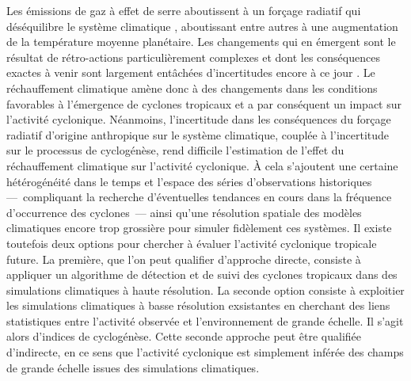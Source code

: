 \documentclass[../main.tex]{subfiles}
\begin{document}
Les émissions de gaz à effet de serre aboutissent à un forçage radiatif qui déséquilibre le système climatique \parencite{charney_carbon_1979}, aboutissant
entre autres à une augmentation de la température moyenne planétaire. Les changements qui en émergent sont le résultat de rétro-actions particulièrement
complexes et dont les conséquences exactes à venir sont largement entâchées d'incertitudes encore à ce jour \parencite{seneviratne_weather_2021}. Le
réchauffement climatique amène donc à des changements dans les conditions favorables à l'émergence de cyclones tropicaux et a par conséquent un impact sur
l'activité cyclonique. Néanmoins, l'incertitude dans les conséquences du forçage radiatif d'origine anthropique sur le système climatique, couplée à
l'incertitude sur le processus de cyclogénèse, rend difficile l'estimation de l'effet du réchauffement climatique sur l'activité cyclonique. À cela s'ajoutent
une certaine hétérogénéité dans le temps et l'espace des séries d'observations historiques ---~compliquant la recherche d'éventuelles tendances en cours dans la
fréquence d'occurrence des cyclones~--- ainsi qu'une résolution spatiale des modèles climatiques encore trop grossière pour simuler fidèlement ces systèmes. Il
existe toutefois deux options pour chercher à évaluer l'activité cyclonique tropicale future. La première, que l'on peut qualifier d'approche directe, consiste
à appliquer un algorithme de détection et de suivi des cyclones tropicaux dans des simulations climatiques à haute résolution. La seconde option consiste à
exploitier les simulations climatiques à basse résolution exsistantes en cherchant des liens statistiques entre l'activité observée et l'environnement de grande
échelle. Il s'agit alors d'indices de cyclogénèse. Cette seconde approche peut être qualifiée d'indirecte, en ce sens que l'activité cyclonique est simplement
inférée des champs de grande échelle issues des simulations climatiques.
\end{document}
